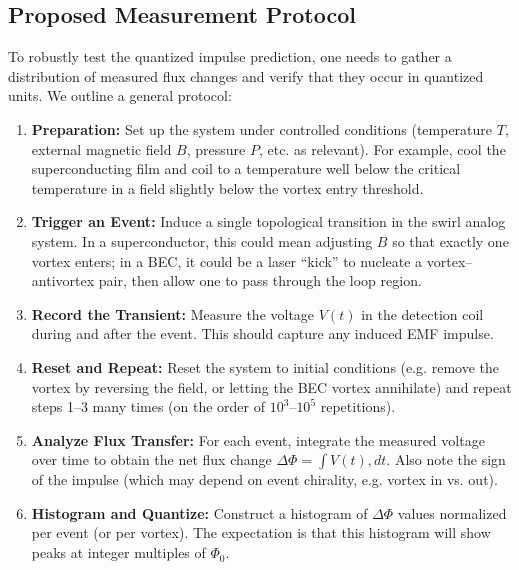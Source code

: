 \documentclass[12pt]{article}
\begin{document}
\subsection{Proposed Measurement Protocol}

To robustly test the quantized impulse prediction, one needs to gather a distribution of measured flux changes and verify that they occur in quantized units. We outline a general protocol:


\begin{enumerate}

\item \textbf{Preparation:} Set up the system under controlled conditions (temperature $T$, external magnetic field $B$, pressure $P$, etc. as relevant). For example, cool the superconducting film and coil to a temperature well below the critical temperature in a field slightly below the vortex entry threshold.

\item \textbf{Trigger an Event:} Induce a single topological transition in the swirl analog system. In a superconductor, this could mean adjusting $B$ so that exactly one vortex enters; in a BEC, it could be a laser ``kick'' to nucleate a vortex--antivortex pair, then allow one to pass through the loop region.

\item \textbf{Record the Transient:} Measure the voltage $V(t)$ in the detection coil during and after the event. This should capture any induced EMF impulse.

\item \textbf{Reset and Repeat:} Reset the system to initial conditions (e.g. remove the vortex by reversing the field, or letting the BEC vortex annihilate) and repeat steps 1–3 many times (on the order of $10^3$–$10^5$ repetitions).

\item \textbf{Analyze Flux Transfer:} For each event, integrate the measured voltage over time to obtain the net flux change $\Delta\Phi = \int V(t) , dt$. Also note the sign of the impulse (which may depend on event chirality, e.g. vortex in vs. out).

\item \textbf{Histogram and Quantize:} Construct a histogram of $\Delta\Phi$ values normalized per event (or per vortex). The expectation is that this histogram will show peaks at integer multiples of $\Phi_{0}$.

\end{enumerate}
\end{document}
